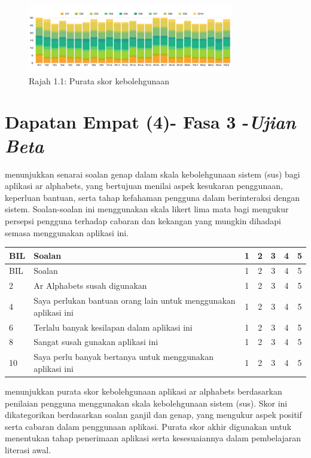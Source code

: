 {{\begin{figure}[h]
\centering
\includegraphics[width=0.8\textwidth]{1.png}
\caption{Rajah 1.1: Purata skor kebolehgunaan}
\end{figure}
\section{\textbf{Dapatan Empat (4)}- Fasa 3 -\textit{Ujian Beta }}
 menunjukkan senarai soalan genap dalam skala kebolehgunaan sistem (sus) bagi aplikasi ar alphabets, yang bertujuan menilai aspek kesukaran penggunaan, keperluan bantuan, serta tahap kefahaman pengguna dalam berinteraksi dengan sistem. Soalan-soalan ini menggunakan skala likert lima mata bagi mengukur persepsi pengguna terhadap cabaran dan kekangan yang mungkin dihadapi semasa menggunakan aplikasi ini.

\begin{longtable}{|>{\raggedright}p{0.8cm}|p{8cm}|c|c|c|c|c|}
\hline
BIL & Soalan & 1 & 2 & 3 & 4 & 5 \\
\hline
\endfirsthead
\hline
BIL & Soalan & 1 & 2 & 3 & 4 & 5 \\
\hline
\endhead
2 & Ar Alphabets susah digunakan & 1 & 2 & 3 & 4 & 5 \\
\hline
4 & Saya perlukan bantuan orang lain untuk menggunakan aplikasi ini & 1 & 2 & 3 & 4 & 5 \\
\hline
6 & Terlalu banyak kesilapan dalam aplikasi ini & 1 & 2 & 3 & 4 & 5 \\
\hline
8 & Sangat susah gunakan aplikasi ini & 1 & 2 & 3 & 4 & 5 \\
\hline
10 & Saya perlu banyak bertanya untuk menggunakan aplikasi ini & 1 & 2 & 3 & 4 & 5 \\
\hline
\end{longtable}

menunjukkan purata skor kebolehgunaan aplikasi ar alphabets berdasarkan penilaian pengguna menggunakan skala kebolehgunaan sistem (sus). Skor ini dikategorikan berdasarkan soalan ganjil dan genap, yang mengukur aspek positif serta cabaran dalam penggunaan aplikasi. Purata skor akhir digunakan untuk menentukan tahap penerimaan aplikasi serta kesesuaiannya dalam pembelajaran literasi awal.
\clearpage
}}
